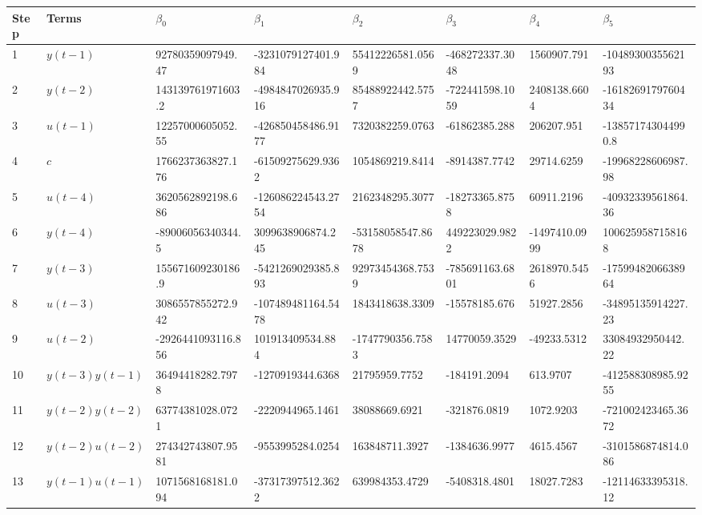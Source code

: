 \begin{tabular}{llllllll}
Step & Terms & $\beta_{0}$ & $\beta_{1}$ & $\beta_{2}$ & $\beta_{3}$ & $\beta_{4}$ & $\beta_{5}$ \\ 
\hline 
1 & $y(t-1)$ & 92780359097949.47 & -3231079127401.984 & 55412226581.0569 & -468272337.3048 & 1560907.791 & -1048930035562193 \\ 
2 & $y(t-2)$ & 143139761971603.2 & -4984847026935.916 & 85488922442.5757 & -722441598.1059 & 2408138.6604 & -1618269179760434 \\ 
3 & $u(t-1)$ & 12257000605052.55 & -426850458486.9177 & 7320382259.0763 & -61862385.288 & 206207.951 & -138571743044990.8 \\ 
4 & $c$ & 1766237363827.176 & -61509275629.9362 & 1054869219.8414 & -8914387.7742 & 29714.6259 & -19968228606987.98 \\ 
5 & $u(t-4)$ & 3620562892198.686 & -126086224543.2754 & 2162348295.3077 & -18273365.8758 & 60911.2196 & -40932339561864.36 \\ 
6 & $y(t-4)$ & -89006056340344.5 & 3099638906874.245 & -53158058547.8678 & 449223029.9822 & -1497410.0999 & 1006259587158168 \\ 
7 & $y(t-3)$ & 155671609230186.9 & -5421269029385.893 & 92973454368.7539 & -785691163.6801 & 2618970.5456 & -1759948206638964 \\ 
8 & $u(t-3)$ & 3086557855272.942 & -107489481164.5478 & 1843418638.3309 & -15578185.676 & 51927.2856 & -34895135914227.23 \\ 
9 & $u(t-2)$ & -2926441093116.856 & 101913409534.884 & -1747790356.7583 & 14770059.3529 & -49233.5312 & 33084932950442.22 \\ 
10 & $y(t-3)y(t-1)$ & 36494418282.7978 & -1270919344.6368 & 21795959.7752 & -184191.2094 & 613.9707 & -412588308985.9255 \\ 
11 & $y(t-2)y(t-2)$ & 63774381028.0721 & -2220944965.1461 & 38088669.6921 & -321876.0819 & 1072.9203 & -721002423465.3672 \\ 
12 & $y(t-2)u(t-2)$ & 274342743807.9581 & -9553995284.0254 & 163848711.3927 & -1384636.9977 & 4615.4567 & -3101586874814.086 \\ 
13 & $y(t-1)u(t-1)$ & 1071568168181.094 & -37317397512.3622 & 639984353.4729 & -5408318.4801 & 18027.7283 & -12114633395318.12 \\ 
\hline 
\end{tabular}